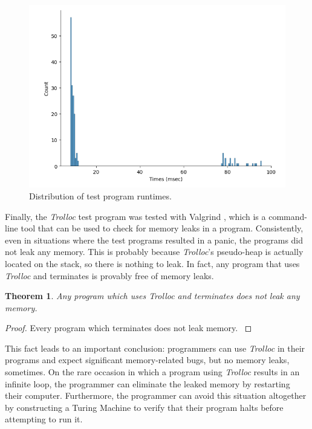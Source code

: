 \documentclass{article}
\newtheorem{theorem}{Theorem}[section]
\begin{document}
\begin{figure}
\caption{Distribution of test program runtimes.}
\includegraphics[width=12cm]{Figure1_TimeDistribution}
\end{figure}\label{fig1:times}

Finally, the \textit{Trolloc} test program was tested with Valgrind \cite{valgrind}, which is a command-line tool that can be used to check for memory leaks in a program. Consistently, even in situations where the test programs resulted in a panic, the programs did not leak any memory. This is probably because \textit{Trolloc}'s pseudo-heap is actually located on the stack, so there is nothing to leak. In fact, any program that uses \textit{Trolloc} and terminates is provably free of memory leaks.

\begin{theorem}
Any program which uses \textit{Trolloc} and terminates does not leak any memory.
\end{theorem}

\begin{proof}
Every program which terminates does not leak memory. \cite{branden}
\end{proof}

This fact leads to an important conclusion: programmers can use \textit{Trolloc} in their programs and expect significant memory-related bugs, but no memory leaks, sometimes. On the rare occasion in which a program using \textit{Trolloc} results in an infinite loop, the programmer can eliminate the leaked memory by restarting their computer. Furthermore, the programmer can avoid this situation altogether by constructing a Turing Machine to verify that their program halts before attempting to run it.
\end{document}
